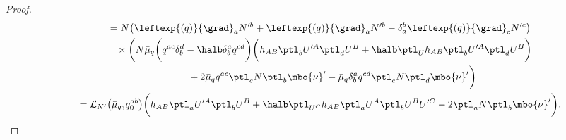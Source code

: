 \begin{proof}
\begin{gather*}
 \qquad{} = N \bigl(\leftexp{(q)}{\grad}_a N'^b + \leftexp{(q)}{\grad}_a N'^b - \delta^b_a \leftexp{(q)}{\grad}_c N'^c\bigr) \\
\qquad\quad{}\times\biggl( N \bar{\mu}_q \biggl(q^{ac} \delta^d_b - \halb \delta^a_b q^{cd}\biggr) \biggl(h_{AB} \ptl_b U'^A \ptl_d U^B + \halb \ptl_{U}h_{AB} \ptl_b U'^A \ptl_d U^B \biggr) \\
\qquad\quad\hphantom{\times\biggl(\,}{} + 2 \bar{\mu}_q q^{ac}\ptl_c N \ptl_b \mbo{\nu}'
 - \bar{\mu}_q \delta^a_b q^{cd} \ptl_c N \ptl_d \mbo{\nu}'\biggr) \\
\qquad{} = \mathcal{L}_{N'} \bigl(\bar{\mu}_{q_0} q^{ab}_0\bigr) \biggl(h_{AB} \ptl_a U'^A \ptl_b U^B + \halb \ptl_{U^C} h_{AB} \ptl_a U^A \ptl_b U^B U'^C -2 \ptl_a N \ptl_b \mbo{\nu}'\biggr).
\end{gather*}


\end{proof}
